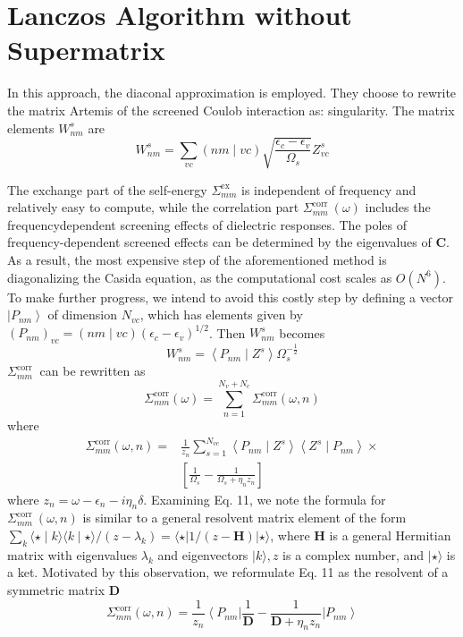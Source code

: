 \section{Lanczos Algorithm without Supermatrix}
In this approach, the diaconal approximation is employed. They choose to rewrite the matrix Artemis of the screened Coulob interaction as:
singularity. The matrix elements $W_{n m}^s$ are
$$
W_{n m}^s=\sum_{v c}(n m \mid v c) \sqrt{\frac{\epsilon_c-\epsilon_v}{\Omega_s}} Z_{v c}^s
$$

The exchange part of the self-energy $\Sigma_{m m}^{\mathrm{ex}}$ is independent of frequency and relatively easy to compute, while the correlation part $\Sigma_{m m}^{\text {corr }}(\omega)$ includes the frequencydependent screening effects of dielectric responses. The poles of frequency-dependent screened effects can be determined by the eigenvalues of $\mathbf{C}$. As a result, the most expensive step of the aforementioned method is diagonalizing the Casida equation, as the computational cost scales as $O\left(N^6\right)$. To make further progress, we intend to avoid this costly step by defining a vector $\left|P_{n m}\right\rangle$ of dimension $N_{v c}$, which has elements given by $\left(P_{n m}\right)_{v c}=(n m \mid v c)\left(\epsilon_c-\epsilon_v\right)^{1 / 2}$. Then $W_{n m}^s$ becomes
$$
W_{n m}^s=\left\langle P_{n m} \mid Z^s\right\rangle \Omega_s^{-\frac{1}{2}}
$$
$\Sigma_{m m}^{\text {corr }}$ can be rewritten as
$$
\Sigma_{m m}^{\mathrm{corr}}(\omega)=\sum_{n=1}^{N_v+N_c} \Sigma_{m m}^{\mathrm{corr}}(\omega, n)
$$
where
$$
\begin{aligned}
\Sigma_{m m}^{\mathrm{corr}}(\omega, n)= & \frac{1}{z_n} \sum_{s=1}^{N_{v c}}\left\langle P_{n m} \mid Z^s\right\rangle\left\langle Z^s \mid P_{n m}\right\rangle \times \\
& {\left[\frac{1}{\Omega_s}-\frac{1}{\Omega_s+\eta_n z_n}\right] }
\end{aligned}
$$
where $z_n=\omega-\epsilon_n-i \eta_n \delta$.
Examining Eq. 11, we note the formula for $\Sigma_{m m}^{\text {corr }}(\omega, n)$ is similar to a general resolvent matrix element of the form $\sum_k\langle\star \mid k\rangle\langle k \mid \star\rangle /\left(z-\lambda_k\right)=\langle\star| 1 /(z-\mathbf{H})|\star\rangle$, where $\mathbf{H}$ is a general Hermitian matrix with eigenvalues $\lambda_k$ and eigenvectors $|k\rangle, z$ is a complex number, and $|\star\rangle$ is a ket. Motivated by this observation, we reformulate Eq. 11 as the resolvent of a symmetric matrix $\mathbf{D}$
$$
\Sigma_{m m}^{\mathrm{corr}}(\omega, n)=\frac{1}{z_n}\left\langle P_{n m}\right| \frac{1}{\mathbf{D}}-\frac{1}{\mathbf{D}+\eta_n z_n}\left|P_{n m}\right\rangle
$$

